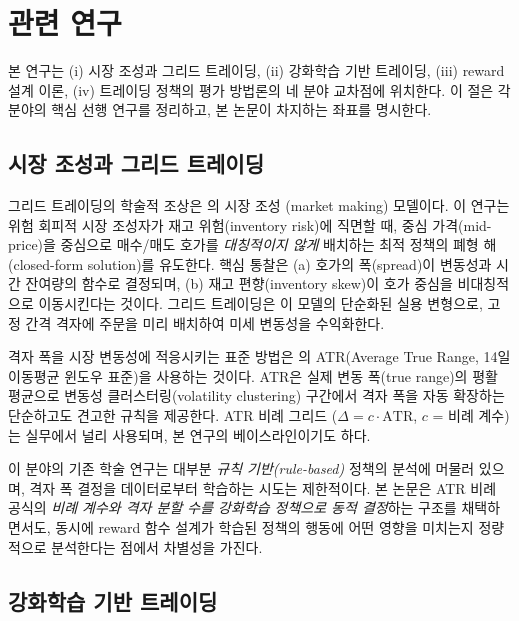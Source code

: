 \documentclass[11pt, a4paper]{article}
\begin{document}
\section{관련 연구}
\label{sec:related}

본 연구는 (i) 시장 조성과 그리드 트레이딩, (ii) 강화학습 기반 트레이딩,
(iii) reward 설계 이론, (iv) 트레이딩 정책의 평가 방법론의 네 분야 교차점에
위치한다. 이 절은 각 분야의 핵심 선행 연구를 정리하고, 본 논문이 차지하는
좌표를 명시한다.

\subsection{시장 조성과 그리드 트레이딩}
\label{sec:related_grid}

그리드 트레이딩의 학술적 조상은 \citet{avellaneda2008market}의 시장 조성
(market making) 모델이다. 이 연구는 위험 회피적 시장 조성자가 재고 위험(inventory
risk)에 직면할 때, 중심 가격(mid-price)을 중심으로 매수/매도 호가를
\emph{대칭적이지 않게} 배치하는 최적 정책의 폐형 해(closed-form solution)를
유도한다. 핵심 통찰은 (a) 호가의 폭(spread)이 변동성과 시간 잔여량의 함수로
결정되며, (b) 재고 편향(inventory skew)이 호가 중심을 비대칭적으로 이동시킨다는
것이다. 그리드 트레이딩은 이 모델의 단순화된 실용 변형으로, 고정 간격 격자에
주문을 미리 배치하여 미세 변동성을 수익화한다.

격자 폭을 시장 변동성에 적응시키는 표준 방법은 \citet{wilder1978atr}의
ATR(Average True Range, 14일 이동평균 윈도우 표준)을 사용하는 것이다. ATR은
실제 변동 폭(true range)의 평활 평균으로 변동성 클러스터링(volatility clustering)
구간에서 격자 폭을 자동 확장하는 단순하고도 견고한 규칙을 제공한다.
ATR 비례 그리드 ($\Delta = c \cdot \mathrm{ATR}$, $c$ = 비례 계수)는 실무에서
널리 사용되며, 본 연구의 베이스라인이기도 하다.

이 분야의 기존 학술 연구는 대부분 \emph{규칙 기반(rule-based)} 정책의 분석에
머물러 있으며, 격자 폭 결정을 데이터로부터 학습하는 시도는 제한적이다. 본 논문은
ATR 비례 공식의 \emph{비례 계수와 격자 분할 수를 강화학습 정책으로 동적 결정}하는
구조를 채택하면서도, 동시에 reward 함수 설계가 학습된 정책의 행동에 어떤 영향을
미치는지 정량적으로 분석한다는 점에서 차별성을 가진다.

\subsection{강화학습 기반 트레이딩}
\label{sec:related_drl}
\end{document}

